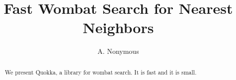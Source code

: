 \documentclass{article}
\begin{document}
\title{Fast Wombat Search for Nearest Neighbors}
\author{A. Nonymous}
\maketitle

\begin{abstract}
We present Quokka, a library for wombat search. It is fast and it is small.
\end{abstract}






\end{document}
